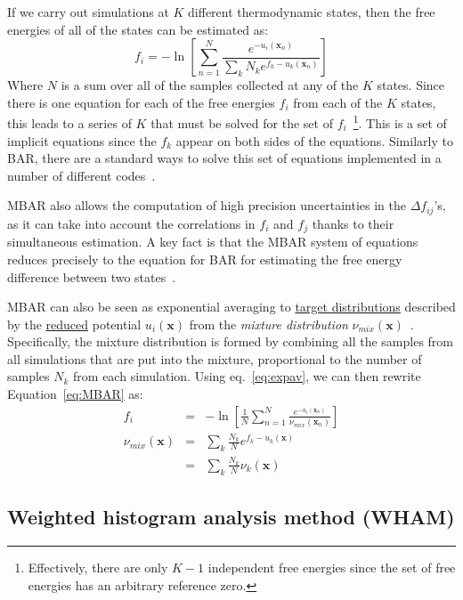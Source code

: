 \documentclass[9pt,review]{livecoms}
\newcommand{\vx}{\mathbf{x}}
\begin{document}
If we carry out simulations at $K$ different thermodynamic states,
then the free energies of all of the states can be estimated as:
\begin{equation}
f_i = -\ln \left[\sum_{n=1}^N \frac{e^{-u_i(\vx_n)}}{\sum_k N_k e^{f_k-u_k(\vx_n)}}\right]
\label{eq:MBAR}
\end{equation}
Where $N$ is a sum over all of the samples collected at any of the $K$ states.
Since there is one equation for each of the free energies $f_i$ from each of the $K$ states, this leads to a series of $K$ that must be solved for the set of $f_i$~\footnote{Effectively, there are only $K-1$ independent free energies since the set of free energies has an arbitrary reference zero.}. This is a set of implicit equations since the $f_k$ appear on both sides of the equations. Similarly to BAR, there are a standard ways to solve this set of equations implemented in a number of different codes~\cite{shirts-chodera:jcp:2008:mbar,tan_binless_2012,Zhang:JPCL:2015}.

MBAR also allows the computation of high precision uncertainties in the $\Delta
f_{ij}$'s, as it can take into account the correlations in $f_i$ and
$f_j$ thanks to their simultaneous estimation.  A key fact is that the MBAR system of equations reduces precisely to the equation for BAR for estimating the free energy difference between two states~\cite{shirts-chodera:jcp:2008:mbar}.

MBAR can also be seen as exponential averaging to \hyperlink{ref:targetdist} {target distributions} described by the \hyperlink{ref:reduced} {reduced} potential $u_i(\vx)$ from the \emph{mixture distribution} $\nu_{mix}(\vx)$~\cite{reweighting_mixture_distribution}. Specifically, the mixture distribution is formed by combining all the samples from all simulations that are put into the mixture, proportional to the number of samples $N_k$ from each simulation.  Using eq.~\ref{eq:expav}, we can then rewrite Equation~\ref{eq:MBAR} as:
\begin{eqnarray}
f_i &=& -\ln \left[\frac{1}{N}\sum_{n=1}^N \frac{e^{-u_i(\vx_n)}}{\nu_{mix}(\vx_n)}\right] \nonumber\\
\nu_{mix}(\vx) &=& \sum_k \frac{N_k}{N} e^{f_k-u_k(\vx)} \nonumber \\
               &=& \sum_k \frac{N_k}{N} \nu_k(\vx)
\end{eqnarray}


\subsection{Weighted histogram analysis method (WHAM)}
\end{document}
